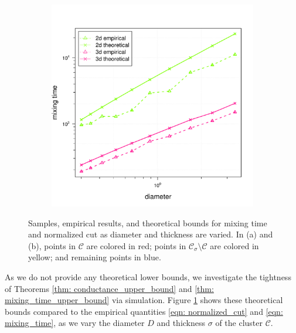 \documentclass{article}
\newcommand{\1}{\mathbf{1}}
\newcommand{\Cset}{\mathcal{C}}
\newcommand{\Csig}{\Cset_{\sigma}}
\theoremstyle{aldenthm}
\theoremstyle{aldenrmrk}
\begin{document}
\begin{figure}
\begin{adjustbox}{minipage=\linewidth,scale=0.8}
\begin{subfigure}{.33\linewidth}
			\caption{}
		\end{subfigure}
		\begin{subfigure}{.33\linewidth}
			\includegraphics[width=\linewidth]{example1plots/diameter_mixing_time_plot}
			\caption{}
		\end{subfigure}
		\caption{Samples, empirical results, and theoretical bounds for mixing time and normalized cut as diameter and thickness are varied. In (a) and (b), points in $\Cset$ are colored in red; points in $\Csig \setminus \Cset$ are colored in yellow; and remaining points in blue.}
		\label{fig:fig1}
	\end{adjustbox}
\end{figure}

As we do not provide any theoretical lower bounds, we investigate the tightness of Theorems \ref{thm: conductance_upper_bound} and \ref{thm: mixing_time_upper_bound} via simulation. Figure \ref{fig:fig1} shows these theoretical bounds compared to the empirical quantities \eqref{eqn: normalized_cut} and \eqref{eqn: mixing_time}, as we vary the diameter $D$ and thickness $\sigma$ of the cluster $\Cset$. 
\end{document}
